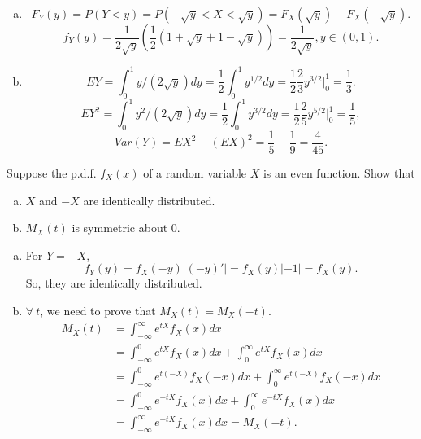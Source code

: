 \documentclass[14pt]{elegantbook}
\begin{document}
    \begin{solution}
        \begin{enumerate}[(a)]
            \item \[F_Y(y)=P(Y<y)=P(-\sqrt{y}<X<\sqrt{y})=F_X(\sqrt{y})-F_X(-\sqrt{y}). \]
            \[f_Y(y)=\frac{1}{2\sqrt{y}}\left(\frac{1}{2}(1+\sqrt{y}+1-\sqrt{y})\right)=\frac{1}{2\sqrt{y}}, y\in(0,1). \]
            \item \[EY=\int_0^1 y/(2\sqrt{y})dy=\frac{1}{2}\int_0^1y^{1/2}dy=\frac{1}{2}\frac{2}{3}y^{3/2}|_0^1=\frac{1}{3}. \]
            \[EY^2=\int_0^1 y^2/(2\sqrt{y})dy=\frac{1}{2}\int_0^1y^{3/2}dy=\frac{1}{2}\frac{2}{5}y^{5/2}|_0^1=\frac{1}{5}, \]
            \[Var(Y)=EX^2-(EX)^2=\frac{1}{5}-\frac{1}{9}=\frac{4}{45}. \]
        \end{enumerate}
    \end{solution}

    \setcounter{exer}{24}
    \begin{exercise}
        Suppose the p.d.f. $f_X(x)$ of a random variable $X$ is an even function. Show that 
        \begin{enumerate}[(a)]
            \item $X$ and $-X$ are identically distributed. 
            \item $M_X(t)$ is symmetric about $0$.
        \end{enumerate}
    \end{exercise}

    \begin{solution}
        \begin{enumerate}[(a)]
            \item For $Y=-X$, 
            \[f_Y(y)=f_X(-y)|(-y)'|=f_X(y)|-1|=f_X(y). \]
            So, they are identically distributed.
            \item $\forall\ t$, we need to prove that $M_X(t)=M_X(-t)$. 
            \begin{align*}
                M_X(t)&=\int_{-\infty}^\infty e^{tX}f_X(x)dx\\
                &=\int_{-\infty}^0 e^{tX}f_X(x)dx+\int_0^\infty e^{tX}f_X(x)dx\\
                &=\int_{-\infty}^0 e^{t(-X)}f_X(-x)dx+\int_0^\infty e^{t(-X)}f_X(-x)dx\\
                &=\int_{-\infty}^0 e^{-tX}f_X(x)dx+\int_0^\infty e^{-tX}f_X(x)dx\\
                &=\int_{-\infty}^\infty e^{-tX}f_X(x)dx=M_X(-t). 
            \end{align*}
        \end{enumerate}
    \end{solution}
\end{document}
